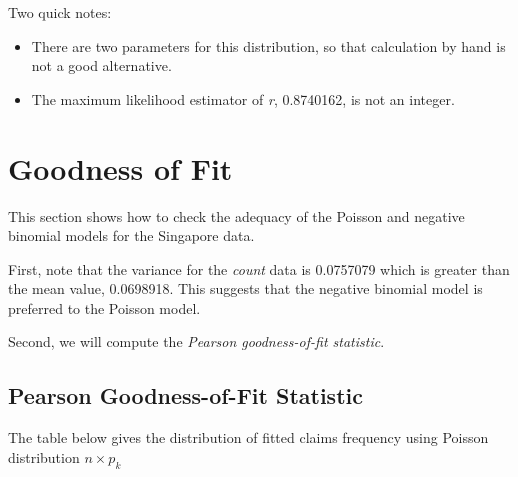 \documentclass[]{book}
\providecommand{\tightlist}{%
  \setlength{\itemsep}{0pt}\setlength{\parskip}{0pt}}
\theoremstyle{definition}
\theoremstyle{definition}
\theoremstyle{definition}
\theoremstyle{remark}
\begin{document}
Two quick notes:

\begin{itemize}
\tightlist
\item
  There are two parameters for this distribution, so that calculation by
  hand is not a good alternative.
\item
  The maximum likelihood estimator of \emph{r}, 0.8740162, is not an
  integer.
\end{itemize}

\section{Goodness of Fit}\label{goodness-of-fit}

This section shows how to check the adequacy of the Poisson and negative
binomial models for the Singapore data.

First, note that the variance for the \emph{count} data is 0.0757079
which is greater than the mean value, 0.0698918. This suggests that the
negative binomial model is preferred to the Poisson model.

Second, we will compute the \emph{Pearson goodness-of-fit statistic}.

\subsection{Pearson Goodness-of-Fit
Statistic}\label{pearson-goodness-of-fit-statistic}

The table below gives the distribution of fitted claims frequency using
Poisson distribution \(n \times p_k\)
\end{document}
